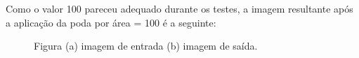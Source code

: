 \documentclass{article}
\begin{document}
	Como o valor 100 pareceu adequado durante os testes, a imagem resultante após a aplicação da poda por área = 100 é a seguinte:
	
	\begin{figure}[H]
		\centering
		\qquad
		\caption{Figura (a) imagem de entrada (b) imagem de saída.} 
		
	\end{figure}
	
\end{document}
